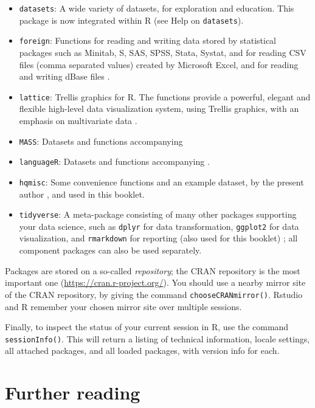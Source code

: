 \documentclass[]{book}
\begin{document}
\begin{itemize}
\item
  \texttt{datasets}: A wide
  variety of datasets, for exploration and education. This
  package is now integrated within R (see Help on \texttt{datasets}).
\item
  \texttt{foreign}: Functions for reading and writing data stored by statistical
  packages such as Minitab, S, SAS, SPSS, Stata, Systat, and for
  reading CSV files (comma separated values) created by Microsoft
  Excel, and for reading and writing dBase files \citep{R-foreign}.
\item
  \texttt{lattice}: Trellis graphics for R. The functions provide a
  powerful, elegant and flexible high-level data visualization system,
  using Trellis graphics, with an emphasis on multivariate data \citep{R-lattice}.
\item
  \texttt{MASS}: Datasets and functions accompanying \citep{VR02, R-MASS}
\item
  \texttt{languageR}: Datasets and functions accompanying \citep{baay08, R-languageR}.
\item
  \texttt{hqmisc}: Some convenience functions and an example dataset, by the present author \citep{R-hqmisc}, and used in this booklet.
\item
  \texttt{tidyverse}: A meta-package consisting of many other packages supporting your data science, such as \texttt{dplyr} for data transformation, \texttt{ggplot2} for data visualization, and \texttt{rmarkdown} for reporting (also used for this booklet) \citep{tidy19}; all component packages can also be used separately.
\end{itemize}

Packages are stored on a so-called \emph{repository}; the CRAN repository is
the most important one (\url{https://cran.r-project.org/}).
You should use a nearby mirror site of the CRAN
repository, by giving the command \texttt{chooseCRANmirror()}.
Rstudio and R remember your chosen mirror site over multiple sessions.

Finally, to inspect the status of your current session in R, use the command \texttt{sessionInfo()}. This will return a listing of technical information, locale settings, all attached packages, and all loaded packages, with version info for each.

\hypertarget{sec:furtherreading}{%
\chapter{Further reading}\label{sec:furtherreading}}
\end{document}
